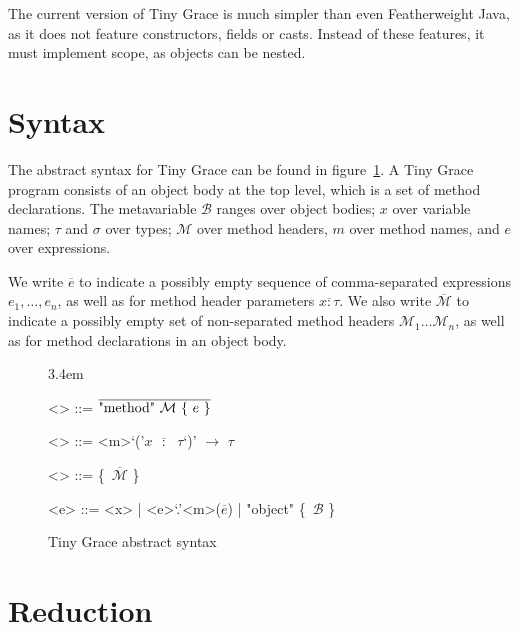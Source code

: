 \documentclass[a4paper, 11pt]{article}
\def\M{\mathcal{M}}
\def\B{\mathcal{B}}
\def\bo{{\sffamily\{}}
\def\bc{{\sffamily\}}}
\begin{document}
\noindent The current version of Tiny Grace is much simpler than even
Featherweight Java, as it does not feature constructors, fields or casts.
Instead of these features, it must implement scope, as objects can be nested.


\section{Syntax}

\def\*#1*{$\overline{#1}$}

The abstract syntax for Tiny Grace can be found in
figure~\ref{fig:abstract-syntax}.  A Tiny Grace program consists of an object
body at the top level, which is a set of method declarations.  The metavariable
$\B$ ranges over object bodies; $x$ over variable names; $\tau$ and $\sigma$ over
types; $\M$ over method headers, $m$ over method names, and $e$ over expressions.

We write \*e* to indicate a possibly empty sequence of comma-separated
expressions $e_1, \dots, e_n$, as well as for method header parameters \*x :
\tau*.  We also write \*\M* to indicate a possibly empty set of non-separated
method headers $\M_1 \dots \M_n$, as well as for method declarations in an
object body.

\begin{figure}

\def\*#1*{$\overline{\text{#1}}$}
\def\<#1>{$#1$}

\grammarindent3.4em
\renewcommand{\grammarlabel}[2]{$#1$\hfill#2}
\renewcommand{\syntleft}{\itshape}
\renewcommand{\syntright}{}
\renewcommand{\ulitleft}{\sffamily\bfseries}
\renewcommand{\litleft}{\sffamily}
\renewcommand{\litright}{}

\begin{grammar}
<\B> ::= \*"method" $\M$ \bo~\<e> \bc*

<\M> ::= <m>`('\*\<x> $:$ $\tau$*`)' $\to$ $\tau$

<\tau> ::= \bo~\*$\M$* \bc

<e> ::= <x> | <e>`.'<m>(\*\<e>*) | "object" \bo~$\B$ \bc
\end{grammar}

\label{fig:abstract-syntax}

\caption{Tiny Grace abstract syntax}

\end{figure}


\section{Reduction}
\end{document}
